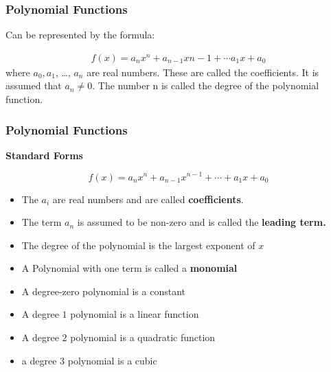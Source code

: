 \documentclass{beamer}
\begin{document}
\begin{frame}[fragile]\frametitle{Polynomial Functions}
\begin{center} Can be represented by the formula: \end{center}
\begin{align*}
  f(x) = a_nx^n + a_{n-1}x{n-1} + \cdots a_1x + a_0
\end{align*}
where $a_0, a_1$, \dots , $a_n$ are real numbers. These are called the coefficients. It is assumed that $a_n \neq 0$. The number n is called the degree of the polynomial function.
\vspace{0.1in}

\end{frame}

\begin{frame}[fragile]\frametitle{Polynomial Functions}
\begin{center} \textbf{Standard Forms} \end{center}

\begin{equation*}
  f(x) = a_nx^n + a_{n-1}x^{n-1}+ \cdots + a_1x+a_0
\end{equation*}

\vfill
\begin{itemize}
  \item The $a_i$ are real numbers and are called  \textbf{coefficients}.
  \item The term $a_n$ is assumed to be non-zero and is called the \textbf{leading term.}
  \item The degree of the polynomial is the largest exponent of $x$
  \item A Polynomial with one term is called a \textbf{monomial}
  \item A degree-zero polynomial is a constant
  \item A degree $1$ polynomial is a linear function
  \item A degree $2$ polynomial is a quadratic function
  \item a degree $3$ polynomial is a cubic
\end{itemize}

\end{frame}
\end{document}
